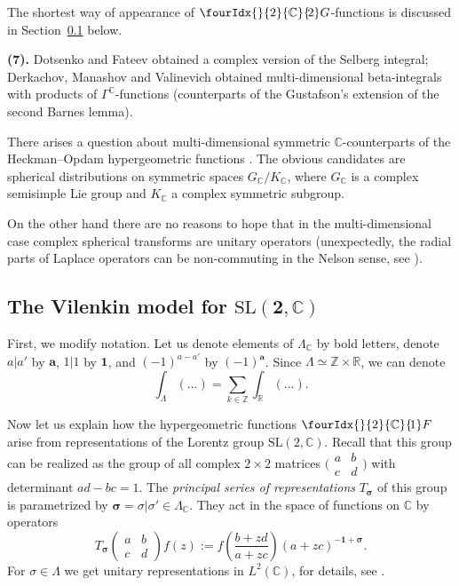 \documentclass[pdftex]{sigma}
\numberwithin{equation}{section}
\newcommand{\hypc}[2]{\fourIdx{}{#1}{\C}{\!#2}F}
\newcommand{\Gc}[2]{\fourIdx{}{#1}{\C}{\!#2}G}
\def\bfa{\mathbf a}
\def\R {{\mathbb R }}
\def\C {{\mathbb C }}
\def\Z{{\mathbb Z}}
\def\sigmA{{\boldsymbol{\sigma}}}
\def\1{\boldsymbol{1}}
\def\SL{\mathrm{SL}}
\begin{document}
The shortest way of appearance of $\Gc{2}{2}$-functions is discussed
in Section~\ref{ss:Vilenkin} below.

\textbf{(7).}
Dotsenko and Fateev \cite{DF} obtained a complex version
of the Selberg integral; Derkachov, Manashov and Valinevich
\cite{DMV1,DMV2} obtained multi-dimensional beta-integrals
with products of $\Gamma^\C$-functions
(counterparts of the Gustafson's extension of the second Barnes lemma).

There arises a question about multi-dimensional symmetric
$\C$-counterparts of the Heckman--Opdam hypergeometric functions \cite{HO}.
The obvious candidates are spherical distributions on symmetric spaces
$G_\C/K_\C$, where $G_\C$ is a complex semisimple Lie group and $K_\C$
a complex symmetric subgroup.

On the other hand there are no reasons to hope
that in the multi-dimensional case complex spherical transforms are
unitary operators (unexpectedly, the radial parts of Laplace operators can
be non-commuting in the Nelson sense, see \cite[Theorem 1.1]{MN}).

\subsection[The Vilenkin model for $\SL(2,\C)$]{The Vilenkin model for $\boldsymbol{\SL(2,\C)}$}\label{ss:Vilenkin}
First, we modify notation.
Let us denote elements of $\Lambda_\C$ by bold letters,
denote $a|a'$ by $\bfa$, $1|1$ by $\1$, and $(-1)^{a-a'}$ by $(-1)^\bfa$.
Since $\Lambda\simeq \Z\times \R$, we can denote
\[
\int_\Lambda(\dots)=\sum_{k\in\Z} \int_\R (\dots).
\]

Now let us explain how the hypergeometric functions $\hypc{2}{1}$
arise from representations of the Lorentz group $\SL(2,\C)$.
Recall that this group can be realized as the group of all complex
$2\times 2$ matrices
$\big(\begin{smallmatrix} a&b\\c&d \end{smallmatrix}\big)$
with determinant $ad-bc=1$.
The \emph{principal series of representations} $T_\sigmA$ of this group
is parametrized by $\sigmA=\sigma|\sigma'\in\Lambda_\C$.
They act in the space of functions on $\C$ by operators
\[
T_\sigmA\begin{pmatrix} a&b\\c&d \end{pmatrix}
f(z):= f\left(\frac{b+zd}{a+zc}\right) (a+zc)^{-\1+\sigmA}.
\]
For $\sigma\in\Lambda$ we get unitary representations in $L^2(\C)$,
for details, see \cite[Chapter~III]{GGV}.
\end{document}
